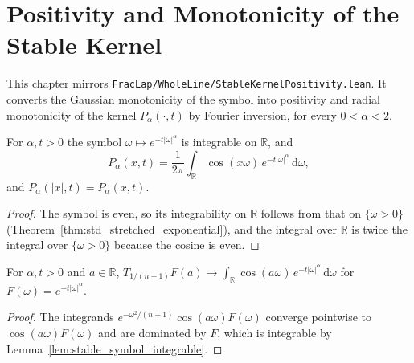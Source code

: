 \chapter{Positivity and Monotonicity of the Stable Kernel}

This chapter mirrors \texttt{FracLap/WholeLine/StableKernelPositivity.lean}. It converts the Gaussian monotonicity of the symbol into positivity and radial monotonicity of the kernel $P_\alpha(\cdot, t)$ by Fourier inversion, for every $0 < \alpha < 2$.

\begin{lemma}\label{lem:stable_symbol_integrable}
\leanok
For $\alpha, t > 0$ the symbol $\omega \mapsto e^{-t \lvert \omega \rvert^\alpha}$ is integrable on $\mathbb{R}$, and
\[
  P_\alpha(x, t) = \frac{1}{2\pi} \int_{\mathbb{R}} \cos(x\omega)\, e^{-t \lvert \omega \rvert^\alpha}\, \mathrm{d}\omega,
\]
and $P_\alpha(\lvert x \rvert, t) = P_\alpha(x, t)$.
\end{lemma}

\begin{proof}
\leanok
The symbol is even, so its integrability on $\mathbb{R}$ follows from that on $\{\omega > 0\}$ (Theorem~\ref{thm:std_stretched_exponential}), and the integral over $\mathbb{R}$ is twice the integral over $\{\omega > 0\}$ because the cosine is even.
\end{proof}

\begin{lemma}\label{lem:gauss_regularization_limit}
\leanok
For $\alpha, t > 0$ and $a \in \mathbb{R}$, $T_{1/(n+1)} F(a) \to \int_{\mathbb{R}} \cos(a\omega)\, e^{-t \lvert \omega \rvert^\alpha}\, \mathrm{d}\omega$ for $F(\omega) = e^{-t \lvert \omega \rvert^\alpha}$.
\end{lemma}

\begin{proof}
\leanok
The integrands $e^{-\omega^2/(n+1)} \cos(a\omega) F(\omega)$ converge pointwise to $\cos(a\omega) F(\omega)$ and are dominated by $F$, which is integrable by Lemma~\ref{lem:stable_symbol_integrable}.
\end{proof}

